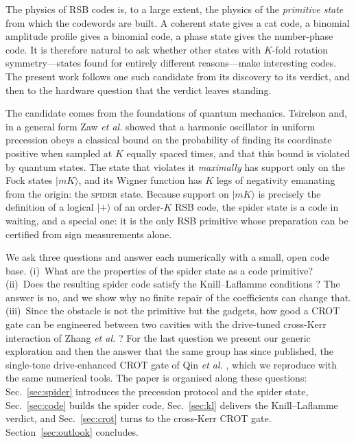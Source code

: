 \documentclass[aps,pra,reprint,superscriptaddress,amsmath,amssymb,nofootinbib]{revtex4-2}
\newcommand{\ket}[1]{|#1\rangle}
\begin{document}
The physics of RSB codes is, to a large extent, the physics of the
\emph{primitive state} from which the codewords are built. A coherent state
gives a cat code, a binomial amplitude profile gives a binomial code, a phase
state gives the number-phase code. It is therefore natural to ask whether other
states with $K$-fold rotation symmetry---states found for entirely different
reasons---make interesting codes. The present work follows one such candidate
from its discovery to its verdict, and then to the hardware question that the
verdict leaves standing.

The candidate comes from the foundations of quantum mechanics. Tsirelson
\cite{tsirelson2006} and, in a general form Zaw \textit{et al.} \cite{zaw2022} showed that a harmonic oscillator in uniform precession obeys a
classical bound on the probability of finding its coordinate positive when
sampled at $K$ equally spaced times, and that this bound is violated by quantum
states. The state that violates it \emph{maximally} has support only on the
Fock states $\ket{mK}$, and its Wigner function has $K$ legs of negativity
emanating from the origin: the \textsc{spider} state. Because support on
$\ket{mK}$ is precisely the definition of a logical $\ket{+}$ of an order-$K$
RSB code, the spider state is a code in waiting, and a special one: it is the
only RSB primitive whose preparation can be certified from sign measurements
alone.

We ask three questions and answer each numerically with a small, open code
base. (i)~What are the properties of the spider state as a code primitive?
(ii)~Does the resulting spider code satisfy the Knill--Laflamme conditions
\cite{knill1997}? The answer is no, and we show why no finite repair of the
coefficients can change that. (iii)~Since the obstacle is not the primitive but
the gadgets, how good a CROT gate can be engineered between two cavities with
the drive-tuned cross-Kerr interaction of Zhang \emph{et al.}
\cite{zhang2022}? For the last question we present our generic exploration
and then the answer that the same group has since published, the single-tone
drive-enhanced CROT gate of Qin \emph{et al.} \cite{qin2026}, which we
reproduce with the same numerical tools. The paper is organised along these questions:
Sec.~\ref{sec:spider} introduces the precession protocol and the spider state,
Sec.~\ref{sec:code} builds the spider code, Sec.~\ref{sec:kl} delivers the
Knill--Laflamme verdict, and Sec.~\ref{sec:crot} turns to the cross-Kerr CROT
gate. Section~\ref{sec:outlook} concludes.
\end{document}
